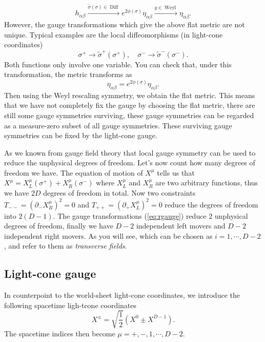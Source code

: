\documentclass[graybox,envcountchap,sectrefs]{svmono}
\begin{document}
\begin{equation}
h_{\alpha\beta}\overset{\tilde{\sigma}(\sigma)\in \operatorname{Diff}}{\longrightarrow}	e^{2\phi(\sigma)}\eta_{\alpha\beta}\overset{g\in \operatorname{Weyl}}{\longrightarrow}\eta_{\alpha\beta}.
\end{equation}
However, the gauge transformations which give the above flat metric are not unique.
Typical examples are the local diffeomorphisms (in light-cone coordinates)
\begin{equation}
	\sigma^{+}\to \tilde{\sigma}^+(\sigma^+),\quad \sigma^{-}\to \tilde{\sigma}^-(\sigma^-). \label{eq:rgauge}
\end{equation}
Both functions only involve one variable. You can check that, under this transformation, the metric transforms as
\begin{equation}
\eta_{\alpha\beta}=	e^{2\phi(\sigma)}\eta_{\alpha\beta}.
\end{equation}
Then using the Weyl rescaling symmetry, we obtain the flat metric.
This means that we have not completely fix the gauge by choosing the flat metric, there are still some gauge symmetries surviving, these gauge symmetries can be regarded as a measure-zero subset of all gauge symmetries.
These surviving gauge symmetries can be fixed by the light-cone gauge.


As we known from gauge field theory that local gauge symmetry can be used to reduce the unphysical degrees of freedom. Let's now count how many degrees of freedom we have.
The equation of motion of $X^{\mu}$ tells us that $X^{\mu}=X_L^{\mu}(\sigma^+)+X_R^{\mu}(\sigma^-)$ where $X_L^{\mu}$ and $X_R^{\mu}$ are two arbitrary functions, thus we have $2D$ degrees of freedom in total.
Now two constraints $T_{--}=(\partial_{-}X_R^{\mu})^2=0$ and  $T_{++}=(\partial_{+}X_L^{\mu})^2=0$ reduce the degrees of freedom into $2(D-1)$.
The gauge transformations (\ref{eq:rgauge}) reduce 2 unphysical degrees of freedom, finally we have $D-2$ independent left movers and $D-2$ independent right movers. As you will see, which can be chosen as $i=1,\cdots, D-2$, and refer to them as \emph{transverse fields}.


\subsection{Light-cone gauge}
In counterpoint to the world-sheet light-cone coordinates, we introduce the following spacetime ligh-tcone coordinates
\begin{equation}
X^{\pm}=\sqrt{\frac{1}{2}}(X^0\pm X^{D-1}).
\end{equation} 
The spacetime indices then become $\mu=+,-,1,\cdots,D-2$.
\end{document}
